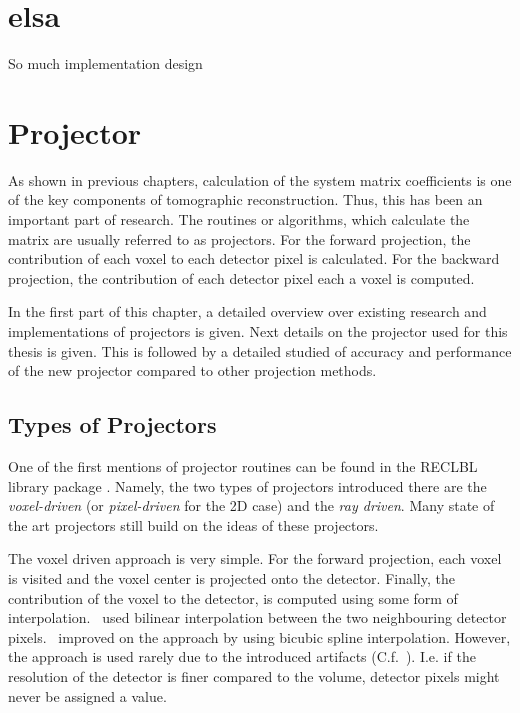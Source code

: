 \chapter{elsa}\label{chap:elsa}

So much implementation design

\chapter{Projector}\label{chap:projector}

As shown in previous chapters, calculation of the system matrix coefficients is one of the key
components of tomographic reconstruction. Thus, this has been an important part of research. The
routines or algorithms, which calculate the matrix are usually referred to as projectors. For the
forward projection, the contribution of each voxel to each detector pixel is calculated. For the
backward projection, the contribution of each detector pixel each a voxel is computed.

In the first part of this chapter, a detailed overview over existing research and implementations of
projectors is given. Next details on the projector used for this thesis is given. This is followed
by a detailed studied of accuracy and performance of the new projector compared to other projection
methods.

\section{Types of Projectors}\label{sec:projector_types}

One of the first mentions of projector routines can be found in the RECLBL library package
. Namely, the two types of projectors introduced there are the
\textit{voxel-driven} (or \textit{pixel-driven} for the 2D case) and the \textit{ray driven}. Many
state of the art projectors still build on the ideas of these projectors.

The voxel driven approach is very simple. For the forward projection, each voxel is visited and the
voxel center is projected onto the detector. Finally, the contribution of the voxel to the detector,
is computed using some form of interpolation.~\cite{peters_algorithms_1981} used bilinear
interpolation between the two neighbouring detector pixels.~\cite{harauz_interpolation_1983}
improved on the approach by using bicubic spline interpolation. However, the approach is used rarely
due to the introduced artifacts (C.f.~\cite[Chapter 3.3]{levakhina_three-dimensional_2014}). I.e. if
the resolution of the detector is finer compared to the volume, detector pixels might never be
assigned a value. 

